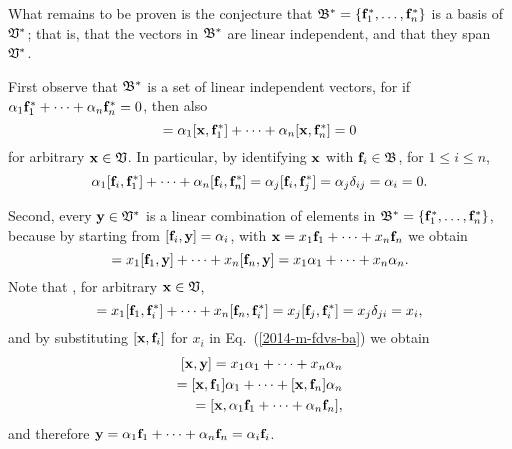 What remains to be proven is the conjecture that
${\frak B}^\ast  = \{{\bf f}_1^\ast ,\ldots , {\bf f}_n^\ast \}$
is a basis of ${\frak V}^\ast $; that is, that the vectors in ${\frak B}^\ast $ are linear independent,
and that they span ${\frak V}^\ast $.

First observe that ${\frak B}^\ast $ is a set of linear independent vectors,
for if
$ \alpha_1 {\bf f}_1^\ast  + \cdots + \alpha_n {\bf f}_n^\ast =0$, then also
\begin{equation}
 [{\bf x},\alpha_1 {\bf f}_1^\ast  + \cdots + \alpha_n {\bf f}_n^\ast ]=
 \alpha_1 [{\bf x},{\bf f}_1^\ast ] + \cdots + \alpha_n [{\bf x},{\bf f}_n^\ast ]=
0
\end{equation}
for arbitrary ${\bf x}\in {\frak V}$.
In particular, by identifying ${\bf x}$ with ${\bf f}_i \in {\frak B}$, for $1 \le i \le n$,
\begin{equation}
 \alpha_1 [{\bf f}_i,{\bf f}_1^\ast ] + \cdots + \alpha_n [{\bf f}_i,{\bf f}_n^\ast ]= \alpha_j [{\bf f}_i,{\bf f}_j^\ast ] = \alpha_j \delta_{ij} = \alpha_i=
0.
\end{equation}

Second,  every ${\bf y} \in {\frak V}^\ast $ is a linear combination of elements in
${\frak B}^\ast  = \{{\bf f}_1^\ast ,\ldots , {\bf f}_n^\ast \}$, because by
starting from
$[{\bf f}_i,  {\bf y}]=\alpha_i$,
with
$ {\bf x} = x_1 {\bf f}_1 +\cdots + x_n {\bf f}_n$
we obtain
\begin{equation}
 [{\bf x},{\bf y}]
= x_1 [{\bf f}_1,{\bf y}] +\cdots + x_n [{\bf f}_n,{\bf y}]
= x_1 \alpha_1 +\cdots + x_n \alpha_n.
\label{2014-m-fdvs-ba}
\end{equation}
Note that , for arbitrary  ${\bf x}\in {\frak V}$,
\begin{equation}
 [{\bf x},{\bf f}_i^\ast ]
= x_1 [{\bf f}_1,{\bf f}_i^\ast ] +\cdots + x_n [{\bf f}_n,{\bf f}_i^\ast ]=  x_j [{\bf f}_j,{\bf f}_i^\ast ]=  x_j \delta_{ji}=  x_i,
\label{2014-m-ch-fdlvs-kju}
\end{equation}
and by substituting $[{\bf x},{\bf f}_i]$ for $x_i$ in Eq.~(\ref{2014-m-fdvs-ba}) we obtain
\begin{equation}
\begin{split}
 [{\bf x},{\bf y}] =
 x_1\alpha_1 +\cdots + x_n \alpha_n \\
= [{\bf x},{\bf f}_1] \alpha_1 +\cdots + [{\bf x},{\bf f}_n] \alpha_n  \\
= [{\bf x},\alpha_1 {\bf f}_1 +\cdots + \alpha_n{\bf f}_n] ,
\label{2014-m-fdvs-ba1}
\end{split}
\end{equation}
and therefore ${\bf y} =\alpha_1 {\bf f}_1 +\cdots + \alpha_n{\bf f}_n=\alpha_i{\bf f}_i$.

